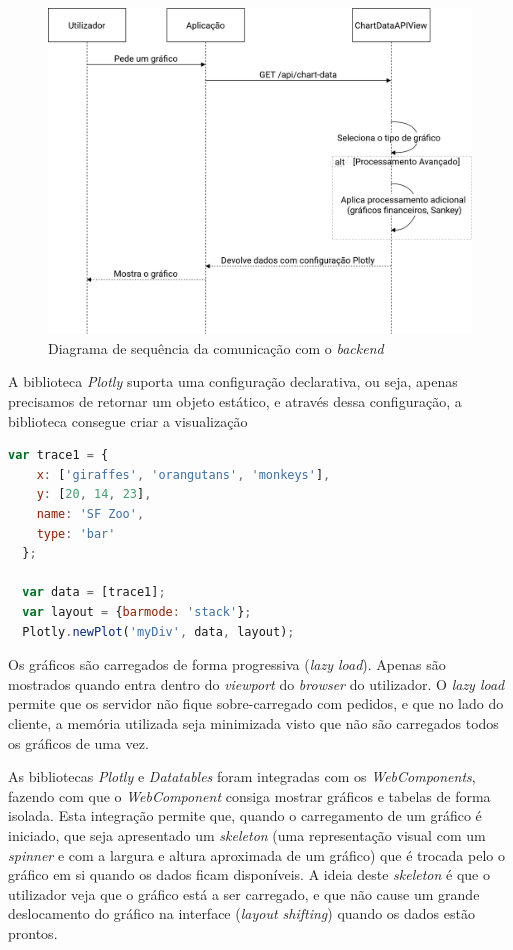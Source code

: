 \begin{figure}[H]
    \centering
    \includegraphics[max width=\textwidth]{./img/sequence}
 \caption{Diagrama de sequência da comunicação com o \textit{backend}}
 \label{fig:sequence}
\end{figure}

A biblioteca \textit{Plotly} suporta uma configuração declarativa, ou seja, apenas precisamos de retornar um objeto estático, e através dessa configuração, a biblioteca consegue criar a visualização

\begin{lstlisting}[language=Javascript, caption={Excerto de uma configuração para um gráfico com a utilização da biblioteca \textit{Plotly}}]
  var trace1 = {
    x: ['giraffes', 'orangutans', 'monkeys'],
    y: [20, 14, 23],
    name: 'SF Zoo',
    type: 'bar'
  };
  
  var data = [trace1];
  var layout = {barmode: 'stack'};
  Plotly.newPlot('myDiv', data, layout);
\end{lstlisting}

Os gráficos são carregados de forma progressiva (\textit{lazy load}). Apenas são mostrados quando entra dentro do \textit{viewport} do \textit{browser} do utilizador. O \textit{lazy load} permite que os servidor não fique sobre-carregado com pedidos, e que no lado do cliente, a memória utilizada seja minimizada visto que não são carregados todos os gráficos de uma vez.	

As bibliotecas \textit{Plotly} e \textit{Datatables} foram integradas com os \textit{WebComponents}\cite{webcomponents}, fazendo com que o \textit{WebComponent} consiga mostrar gráficos e tabelas de forma isolada. Esta integração permite que, quando o carregamento de um gráfico é iniciado, que seja apresentado  um \textit{skeleton} (uma representação visual com um \textit{spinner} e com a largura e altura aproximada de um gráfico) que é trocada pelo o gráfico em si quando os dados ficam disponíveis. A ideia deste \textit{skeleton} é que o utilizador veja que o gráfico está a ser carregado, e que não cause um grande deslocamento do gráfico na interface (\textit{layout shifting}) quando os dados estão prontos. 

